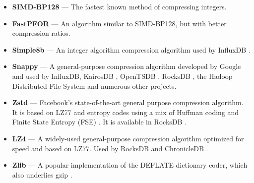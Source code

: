 \begin{itemize}[leftmargin=4mm]
\itemsep0mm
\item \textbf{SIMD-BP128} \cite{fastpfor} --- The fastest known method of compressing integers.
\item \textbf{FastPFOR} \cite{fastpfor} --- An algorithm similar to SIMD-BP128, but with better compression ratios.
\item \textbf{Simple8b} \cite{simple8b} --- An integer algorithm compression algorithm used by InfluxDB \cite{influxDB}.
\item \textbf{Snappy} \cite{snappy} --- A general-purpose compression algorithm developed by Google and used by InfluxDB, KairosDB \cite{kairosDB}, OpenTSDB \cite{openTSDB}, RocksDB \cite{rocksDB}, the Hadoop Distributed File System \cite{hdfs} and numerous other projects.
\item \textbf{Zstd} \cite{zstd} --- Facebook's state-of-the-art general purpose compression algorithm. It is based on LZ77 and entropy codes using a mix of Huffman coding and Finite State Entropy (FSE) \cite{fse}. It is available in RocksDB \cite{rocksDB}.
\item \textbf{LZ4} \cite{lz4} --- A widely-used general-purpose compression algorithm optimized for speed and based on LZ77. Used by RocksDB and ChronicleDB \cite{chronicleDB}.
\item \textbf{Zlib} \cite{zlib} --- A popular implementation of the DEFLATE \cite{deflate} dictionary coder, which also underlies gzip \cite{gzip}.

\end{itemize}

